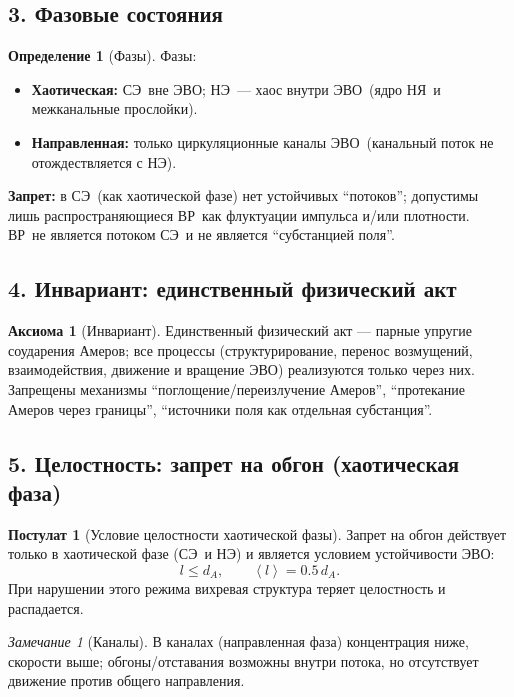 \documentclass[12pt]{article}
\newcommand{\SE}{\mbox{\textsc{СЭ}}}
\newcommand{\EVO}{\mbox{\textsc{ЭВО}}}
\newcommand{\VR}{\mbox{\textsc{ВР}}}
\newcommand{\NE}{\mbox{\textsc{НЭ}}}
\newcommand{\NY}{\mbox{\textsc{НЯ}}}
\theoremstyle{definition}
\newtheorem{definition}{Определение}[section]
\newtheorem{axiom}{Аксиома}[section]
\newtheorem{postulate}{Постулат}[section]
\theoremstyle{plain}
\theoremstyle{remark}
\newtheorem{remark}{Замечание}[section]
\newcommand{\mean}[1]{\left\langle #1 \right\rangle}
\begin{document}
\subsection{3. Фазовые состояния}
\begin{definition}[Фазы]
Фазы:
\begin{itemize}
\item \textbf{Хаотическая:} \SE\ вне \EVO; \NE\ — хаос внутри \EVO\ (ядро \NY\ и межканальные прослойки).
\item \textbf{Направленная:} только циркуляционные каналы \EVO\ (канальный поток не отождествляется с \NE).
\end{itemize}
\textbf{Запрет:} в \SE\ (как хаотической фазе) нет устойчивых ``потоков''; допустимы лишь распространяющиеся \VR\
как флуктуации импульса и/или плотности. \VR\ не является потоком \SE\ и не является ``субстанцией поля''.
\end{definition}

\subsection{4. Инвариант: единственный физический акт}
\begin{axiom}[Инвариант]
Единственный физический акт — парные упругие соударения Амеров; все процессы (структурирование, перенос возмущений,
взаимодействия, движение и вращение \EVO) реализуются только через них.
Запрещены механизмы ``поглощение/переизлучение Амеров'', ``протекание Амеров через границы'',
``источники поля как отдельная субстанция''.
\end{axiom}

\subsection{5. Целостность: запрет на обгон (хаотическая фаза)}
\begin{postulate}[Условие целостности хаотической фазы]
Запрет на обгон действует только в хаотической фазе (\SE\ и \NE) и является условием устойчивости \EVO:
\[
l \le d_A, \qquad \mean{l} = 0.5\,d_A.
\]
При нарушении этого режима вихревая структура теряет целостность и распадается.
\end{postulate}

\begin{remark}[Каналы]
В каналах (направленная фаза) концентрация ниже, скорости выше; обгоны/отставания возможны внутри потока,
но отсутствует движение против общего направления.
\end{remark}
\end{document}
